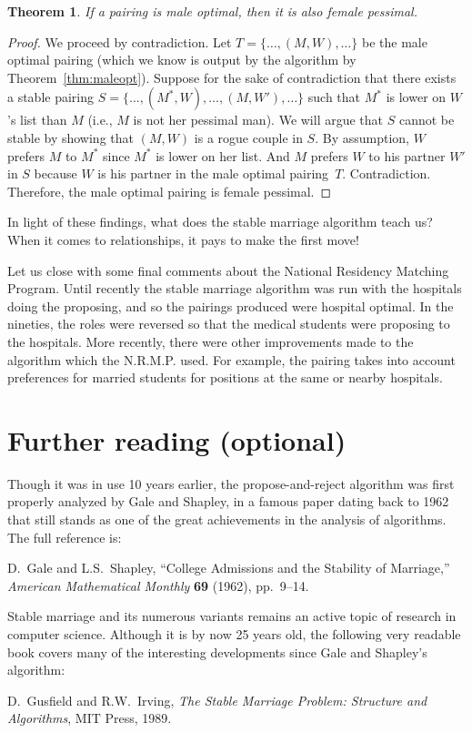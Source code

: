 \documentclass[11pt,fleqn]{article}
\newcounter{thm}
\newtheorem{theorem}{Theorem}[thm]
\begin{document}
\begin{theorem} \label{thm:femalepes}
    If a pairing is male optimal, then it is also female pessimal.
\end{theorem}
\begin{proof}
We proceed by contradiction. Let $T = \{\ldots, (M, W), \ldots\}$ be the male optimal pairing
(which we know is output by the algorithm by Theorem~\ref{thm:maleopt}).
Suppose for the sake of contradiction that there exists a stable pairing $S =
\{\ldots, (M^\ast, W), \ldots, (M, W'), \ldots\}$
such that $M^\ast$ is lower on $W$'s list than $M$ (i.e., $M$ is not her pessimal man).
We will argue that $S$ cannot be stable by showing that $(M,W)$ is a
rogue couple in $S$.  By assumption, $W$
prefers $M$ to $M^\ast$ since $M^\ast$ is lower on her list. And $M$ prefers $W$ to his
partner $W'$ in $S$ because $W$ is his partner in the male optimal pairing~$T$.
Contradiction. Therefore, the male optimal pairing is female pessimal.
\end{proof}

In light of these findings, what does the stable marriage algorithm teach us? When it comes to relationships, it pays to make the first move!

Let us close with some final comments about the National Residency Matching Program. Until recently the stable marriage algorithm was run with the
hospitals doing the proposing, and so the pairings produced were hospital
optimal. In the nineties, the roles were reversed so that the medical
students were proposing to the hospitals. More recently, there were
other improvements made to the algorithm which the N.R.M.P. used. For
example, the pairing takes into account preferences for married
students for positions at the same or nearby hospitals.

\section{Further reading (optional)}
Though it was in use 10 years earlier, the propose-and-reject algorithm
was first properly analyzed by Gale and Shapley, in a famous paper
dating back to 1962 that still stands as one of the great achievements in
the analysis of algorithms.  The full reference is:

D.~Gale and L.S.~Shapley, ``College Admissions and the Stability of Marriage,''
{\it American Mathematical Monthly\/} {\bf 69} (1962), pp.~9--14.

Stable marriage and its numerous variants remains an active topic of research
in computer science.  Although it is by now 25 years old, the
following very readable book covers many of the interesting developments since
Gale and Shapley's algorithm:

D.~Gusfield and R.W.~Irving, {\it The Stable Marriage Problem: Structure and Algorithms},
MIT Press, 1989.
\end{document}
